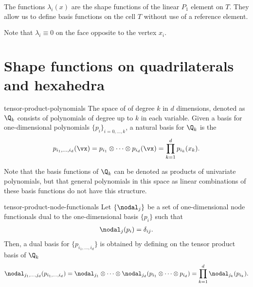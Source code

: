 \begin{remark}
  The functions $\lambda_i(x)$ are the shape functions of the linear
  $P_1$ element on $T$. They allow us to define basis functions on the
  cell $T$ without use of a reference element.

  Note that $\lambda_i\equiv 0$ on the face opposite to the
  vertex $x_i$.
\end{remark}

\section{Shape functions on quadrilaterals and hexahedra}

\begin{Definition}{tensor-product-polynomials}
  The space of  of degree $k$ in
  $d$ dimensions, denoted as $\Q_k$ consists of polynomials of degree
  up to $k$ in each variable. Given a basis for one-dimensional
  polynomials $\{p_i\}_{i=0,\dots,k}$, a natural basis for $\Q_k$ is
  the 
  \begin{gather}
    \label{eq:fem-intro:1}
    p_{i_1,\dots,i_d}(\vx)
    = p_{i_1}\otimes \dots\otimes p_{i_d}(\vx)
    = \prod_{k=1}^d p_{i_k}(x_k).
  \end{gather}
\end{Definition}

\begin{remark}
  Note that the basis functions of $\Q_k$ can be denoted as products
  of univariate polynomials, but that general polynomials in this
  space as linear combinations of these basis functions do not have
  this structure.
\end{remark}

\begin{Lemma}{tensor-product-node-functionals}
  Let $\{\nodal_j\}$ be a set of one-dimensional node functionals dual
  to the one-dimensional basis $\{p_i\}$ such that
  \begin{gather}
    \nodal_j(p_i) = \delta_{ij}.
  \end{gather}
  Then, a dual basis for $\{p_{i_1,\dots,i_d}\}$ is obtained by
  defining on the tensor product basis of $\Q_k$
  \begin{gather}
    \label{eq:fem-intro:2}
    \nodal_{j_1,\dots,j_d}(p_{i_1,\dots,i_d})
    = \nodal_{j_1} \otimes \dots\otimes \nodal_{j_d}(p_{i_1}\otimes\dots\otimes p_{i_d})
    = \prod_{k=1}^d \nodal_{j_k}(p_{i_k}).
  \end{gather}
\end{Lemma}

